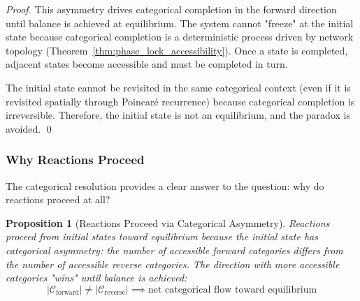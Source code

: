 \documentclass[12pt,a4paper]{article}
\newtheorem{proposition}[theorem]{Proposition}
\theoremstyle{definition}
\theoremstyle{remark}
\begin{document}
\begin{proof}
This asymmetry drives categorical completion in the forward direction until balance is achieved at equilibrium. The system cannot "freeze" at the initial state because categorical completion is a deterministic process driven by network topology (Theorem~\ref{thm:phase_lock_accessibility}). Once a state is completed, adjacent states become accessible and must be completed in turn.

The initial state cannot be revisited in the same categorical context (even if it is revisited spatially through Poincaré recurrence) because categorical completion is irreversible. Therefore, the initial state is not an equilibrium, and the paradox is avoided. \qed
\end{proof}

\subsubsection{Why Reactions Proceed}

The categorical resolution provides a clear answer to the question: why do reactions proceed at all?

\begin{proposition}[Reactions Proceed via Categorical Asymmetry]
\label{prop:reactions_proceed}
Reactions proceed from initial states toward equilibrium because the initial state has categorical asymmetry: the number of accessible forward categories differs from the number of accessible reverse categories. The direction with more accessible categories "wins" until balance is achieved:
\begin{equation}
|\mathcal{C}_{\text{forward}}| \neq |\mathcal{C}_{\text{reverse}}| \implies \text{net categorical flow toward equilibrium}
\label{eq:categorical_asymmetry}
\end{equation}
\end{proposition}
\end{document}
